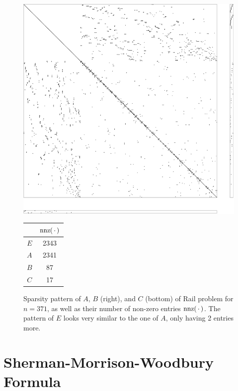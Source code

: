 \begin{figure}[t]
  \centering
  \begin{minipage}[c]{0.6\textwidth}
    \includegraphics[width=\textwidth]{figures/spy_ABC.pdf}
  \end{minipage}
  \begin{minipage}[c]{0.25\textwidth}
    \flushright
    \begin{tabular}{cS[table-format=4.0]}
      \toprule
      & {$\nnz(\optional{})$} \\
      \midrule
      $E$ & 2343 \\
      $A$ & 2341 \\
      $B$ & 87 \\
      $C$ & 17 \\
      \bottomrule
    \end{tabular}
  \end{minipage}
  \caption[Sparsity pattern of Rail problem]{%
    Sparsity pattern of $A$, $B$ (right), and $C$ (bottom) of Rail problem for $n=371$,
    as well as their number of non-zero entries $\nnz(\optional{})$.
    The pattern of $E$ looks very similar to the one of $A$, only having 2 entries more.
  }
  \label{fig:spy}
\end{figure}

\section{Sherman-Morrison-Woodbury Formula}
\label{sec:basics:smw}

